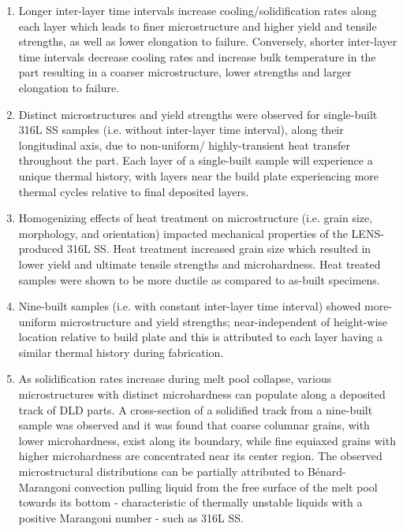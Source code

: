 \documentclass[10pt]{article}
\begin{document}
\begin{enumerate}
  \item Longer inter-layer time intervals increase cooling/solidification rates along each layer which leads to finer microstructure and higher yield and tensile strengths, as well as lower elongation to failure. Conversely, shorter inter-layer time intervals decrease cooling rates and increase bulk temperature in the part resulting in a coarser microstructure, lower strengths and larger elongation to failure.

  \item Distinct microstructures and yield strengths were observed for single-built 316L SS samples (i.e. without inter-layer time interval), along their longitudinal axis, due to non-uniform/ highly-transient heat transfer throughout the part. Each layer of a single-built sample will experience a unique thermal history, with layers near the build plate experiencing more thermal cycles relative to final deposited layers.

  \item Homogenizing effects of heat treatment on microstructure (i.e. grain size, morphology, and orientation) impacted mechanical properties of the LENS-produced 316L SS. Heat treatment increased grain size which resulted in lower yield and ultimate tensile strengths and microhardness. Heat treated samples were shown to be more ductile as compared to as-built specimens.

  \item Nine-built samples (i.e. with constant inter-layer time interval) showed more-uniform microstructure and yield strengths; near-independent of height-wise location relative to build plate and this is attributed to each layer having a similar thermal history during fabrication.

  \item As solidification rates increase during melt pool collapse, various microstructures with distinct microhardness can populate along a deposited track of DLD parts. A cross-section of a solidified track from a nine-built sample was observed and it was found that coarse columnar grains, with lower microhardness, exist along its boundary, while fine equiaxed grains with higher microhardness are concentrated near its center region. The observed microstructural distributions can be partially attributed to Bénard-Marangoni convection pulling liquid from the free surface of the melt pool towards its bottom - characteristic of thermally unstable liquids with a positive Marangoni number - such as 316L SS.


\end{enumerate}
\end{document}
